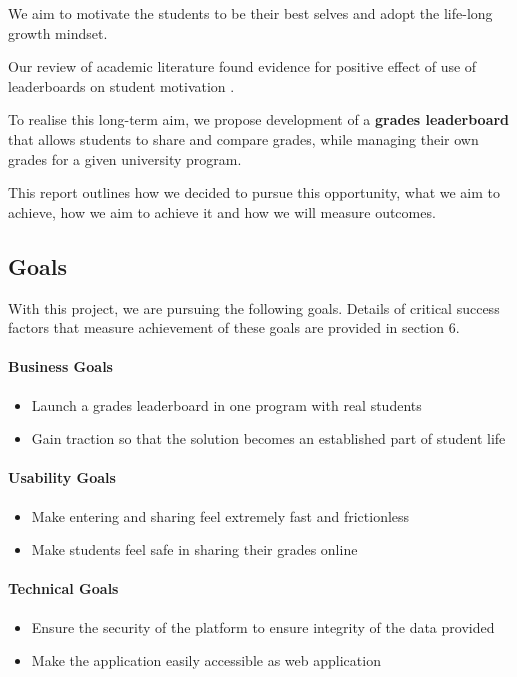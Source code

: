 We aim to motivate the students to be their best selves and adopt the life-long growth mindset.

Our review of academic literature found evidence for positive effect of use of leaderboards on student motivation \cite{chiu_effects_2017} \cite{jia_designing_2017}.

To realise this long-term aim, we propose development of a \textbf{grades leaderboard} that allows students to share and compare grades, while managing their own grades for a given university program. 

This report outlines how we decided to pursue this opportunity, what we aim to achieve, how we aim to achieve it and how we will measure outcomes.

\subsection{Goals}
With this project, we are pursuing the following goals. Details of critical success factors that measure achievement of these goals are provided in section 6.

\paragraph{Business Goals}
\begin{itemize}
    \item Launch a grades leaderboard in one program with real students
    \item Gain traction so that the solution becomes an established part of student life
\end{itemize}

\paragraph{Usability Goals}
\begin{itemize}
    \item Make entering and sharing feel extremely fast and frictionless
    \item Make students feel safe in sharing their grades online
\end{itemize}

\paragraph{Technical Goals}
\begin{itemize}
    \item Ensure the security of the platform to ensure integrity of the data provided
    \item Make the application easily accessible as web application
\end{itemize}


